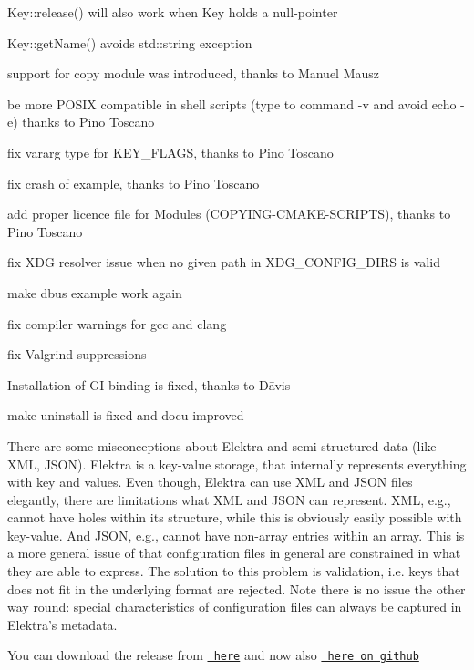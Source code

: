\begin{DoxyItemize}
\item Key\+::release() will also work when Key holds a null-\/pointer
\item Key\+::get\+Name() avoids std\+::string exception
\item support for copy module was introduced, thanks to Manuel Mausz
\item be more P\+O\+S\+IX compatible in shell scripts ({\ttfamily type} to {\ttfamily command -\/v} and avoid {\ttfamily echo -\/e}) thanks to Pino Toscano
\item fix vararg type for K\+E\+Y\+\_\+\+F\+L\+A\+GS, thanks to Pino Toscano
\item fix crash of example, thanks to Pino Toscano
\item add proper licence file for Modules (C\+O\+P\+Y\+I\+N\+G-\/\+C\+M\+A\+K\+E-\/\+S\+C\+R\+I\+P\+TS), thanks to Pino Toscano
\item fix X\+DG resolver issue when no given path in X\+D\+G\+\_\+\+C\+O\+N\+F\+I\+G\+\_\+\+D\+I\+RS is valid
\item make dbus example work again
\item fix compiler warnings for gcc and clang
\item fix Valgrind suppressions
\item Installation of GI binding is fixed, thanks to Dāvis
\item make uninstall is fixed and docu improved
\end{DoxyItemize}

There are some misconceptions about Elektra and semi structured data (like X\+ML, J\+S\+ON). Elektra is a key-\/value storage, that internally represents everything with key and values. Even though, Elektra can use X\+ML and J\+S\+ON files elegantly, there are limitations what X\+ML and J\+S\+ON can represent. X\+ML, e.\+g., cannot have holes within its structure, while this is obviously easily possible with key-\/value. And J\+S\+ON, e.\+g., cannot have non-\/array entries within an array. This is a more general issue of that configuration files in general are constrained in what they are able to express. The solution to this problem is validation, i.\+e. keys that does not fit in the underlying format are rejected. Note there is no issue the other way round\+: special characteristics of configuration files can always be captured in Elektra’s metadata.

You can download the release from \href{https://www.libelektra.org/ftp/elektra/releases/elektra-0.8.13.tar.gz}{\texttt{ here}} and now also \href{https://github.com/ElektraInitiative/ftp/tree/master/releases/elektra-0.8.13.tar.gz}{\texttt{ here on github}}


